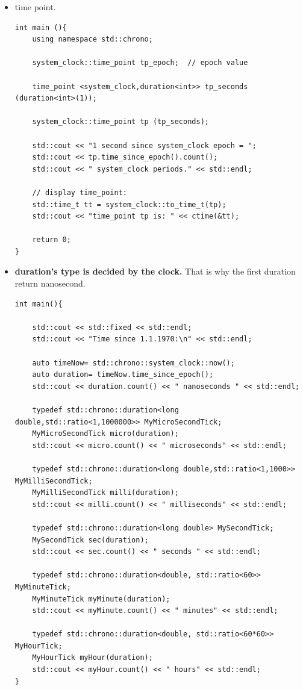 \documentclass[a4paper,11pt,twoside]{book}
\begin{document}
\begin{itemize}
	\item time point.
\begin{lstlisting}[numbers=none]
int main (){
	using namespace std::chrono;
	
	system_clock::time_point tp_epoch;	// epoch value
	
	time_point <system_clock,duration<int>> tp_seconds (duration<int>(1));
	
	system_clock::time_point tp (tp_seconds);
	
	std::cout << "1 second since system_clock epoch = ";
	std::cout << tp.time_since_epoch().count();
	std::cout << " system_clock periods." << std::endl;
	
	// display time_point:
	std::time_t tt = system_clock::to_time_t(tp);
	std::cout << "time_point tp is: " << ctime(&tt);
	
	return 0;
}
\end{lstlisting}
	
	\item \textbf{duration's type is decided by the clock. } That is why the first duration return nanosecond. 
\begin{lstlisting}[numbers=none]
int main(){	
	
	std::cout << std::fixed << std::endl;
	std::cout << "Time since 1.1.1970:\n" << std::endl;
	
	auto timeNow= std::chrono::system_clock::now();
	auto duration= timeNow.time_since_epoch();
	std::cout << duration.count() << " nanoseconds " << std::endl;
	
	typedef std::chrono::duration<long double,std::ratio<1,1000000>> MyMicroSecondTick;
	MyMicroSecondTick micro(duration);
	std::cout << micro.count() << " microseconds" << std::endl;
	
	typedef std::chrono::duration<long double,std::ratio<1,1000>> MyMilliSecondTick;
	MyMilliSecondTick milli(duration);
	std::cout << milli.count() << " milliseconds" << std::endl;
	
	typedef std::chrono::duration<long double> MySecondTick;
	MySecondTick sec(duration);
	std::cout << sec.count() << " seconds " << std::endl;
	
	typedef std::chrono::duration<double, std::ratio<60>> MyMinuteTick;
	MyMinuteTick myMinute(duration);
	std::cout << myMinute.count() << " minutes" << std::endl;
	
	typedef std::chrono::duration<double, std::ratio<60*60>> MyHourTick;
	MyHourTick myHour(duration);
	std::cout << myHour.count() << " hours" << std::endl;
}
\end{lstlisting}
\end{itemize}
\end{document}
